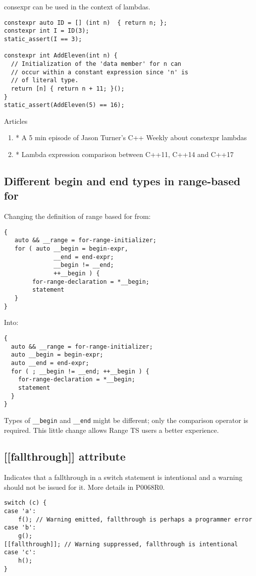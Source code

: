 consexpr can be used in the context of lambdas.

\begin{verbatim}
constexpr auto ID = [] (int n)  { return n; };
constexpr int I = ID(3);
static_assert(I == 3);

constexpr int AddEleven(int n) {
  // Initialization of the 'data member' for n can
  // occur within a constant expression since 'n' is
  // of literal type.
  return [n] { return n + 11; }();
}
static_assert(AddEleven(5) == 16);
\end{verbatim}

Articles 
\begin{enumerate}
\item * A 5 min episode of Jason Turner’s C++ Weekly about constexpr lambdas 
\item * Lambda expression comparison between C++11, C++14 and C++17
\end{enumerate}

\subsection{Different begin and end types in range-based for}

Changing the definition of range based for from:
\begin{verbatim}
{
   auto && __range = for-range-initializer;
   for ( auto __begin = begin-expr,
              __end = end-expr;
              __begin != __end;
              ++__begin ) {
        for-range-declaration = *__begin;
        statement
   }
}
\end{verbatim}

Into:

\begin{verbatim}
{
  auto && __range = for-range-initializer;
  auto __begin = begin-expr;
  auto __end = end-expr;
  for ( ; __begin != __end; ++__begin ) {
    for-range-declaration = *__begin;
    statement
  }
}
\end{verbatim}

Types of \texttt{__begin} and \texttt{__end} might be different; only the comparison operator is required. This little change allows Range TS users a better experience.

\subsection{[[fallthrough]] attribute}

Indicates that a fallthrough in a switch statement is intentional and a warning should not be issued for it. More details in P0068R0.
\begin{verbatim}
switch (c) {
case 'a':
    f(); // Warning emitted, fallthrough is perhaps a programmer error
case 'b':
    g();
[[fallthrough]]; // Warning suppressed, fallthrough is intentional
case 'c':
    h();
}
\end{verbatim}

